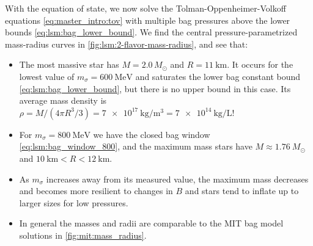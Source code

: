 With the equation of state, we now solve the Tolman-Oppenheimer-Volkoff equations \eqref{eq:master_intro:tov} with multiple bag pressures above the lower bounds \eqref{eq:lsm:bag_lower_bound}.
We find the central pressure-parametrized mass-radius curves in \cref{fig:lsm:2-flavor-mass-radius}, and see that:
\begin{itemize}
\item The most massive star has $M = 2.0 \, M_\odot$ and $R = \SI{11}{\kilo\meter}$.
      It occurs for the lowest value of $m_\sigma=\SI{600}{\mega\electronvolt}$ and saturates the lower bag constant bound \eqref{eq:lsm:bag_lower_bound}, but there is no upper bound in this case.
      Its average mass density is $\rho = M / (4 \pi R^3/3) = \SI{7e17}{\kilo\gram\per\meter\cubed} = \SI{7e14}{\kilo\gram\per\liter}$!
\item For $m_\sigma = \SI{800}{\mega\electronvolt}$ we have the closed bag window \eqref{eq:lsm:bag_window_800},
      and the maximum mass stars have $M \approx \SI{1.76}{} M_\odot$ and $\SI{10}{\kilo\meter} < R < \SI{12}{\kilo\meter}$.
\item As $m_\sigma$ increases away from its measured value,
      the maximum mass decreases and becomes more resilient to changes in $B$ and stars tend to inflate up to larger sizes for low pressures.
\item In general the masses and radii are comparable to the MIT bag model solutions in \cref{fig:mit:mass_radius}.
\end{itemize}

